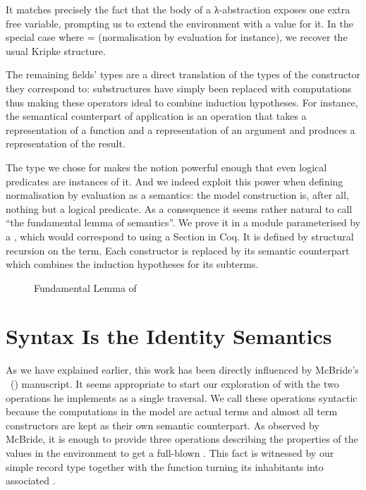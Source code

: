 It matches precisely the fact that the body of a λ-abstraction exposes
one extra free variable, prompting us to extend the environment with a
value for it. In the special case where  =  (normalisation
by evaluation for instance), we recover the usual Kripke structure.


The remaining fields' types are a direct translation of the types of the
constructor they correspond to: substructures have simply been replaced with
computations thus making these operators ideal to combine induction hypotheses.
For instance, the semantical counterpart of application is an operation that
takes a representation of a function and a representation of an argument and
produces a representation of the result.


The type we chose for  makes the  notion powerful enough that
even logical predicates are instances of it. And we indeed exploit this power when
defining normalisation by evaluation as a semantics: the model construction is, after
all, nothing but a logical predicate. As a consequence it seems rather natural to call
 ``the fundamental lemma of semantics''. We prove it in a module parameterised
by a , which would correspond to using a Section in Coq. It is defined by
structural recursion on the term. Each constructor is replaced by its semantic counterpart
which combines the induction hypotheses for its subterms.

\begin{figure}[h]
\caption{Fundamental Lemma of \label{fig:fundsem}}
\end{figure}

\section{Syntax Is the Identity Semantics}
\label{sec:syntactic}

As we have explained earlier, this work has been directly influenced by
McBride's ~(\citeyear{mcbride2005type}) manuscript. It seems appropriate
to start our exploration of  with the two operations he
implements as a single traversal. We call these operations syntactic
because the computations in the model are actual terms and almost all term
constructors are kept as their own semantic counterpart. As observed by
McBride, it is enough to provide three operations describing the properties
of the values in the environment to get a full-blown . This
fact is witnessed by our simple  record type together with
the  function turning its inhabitants into associated
.

